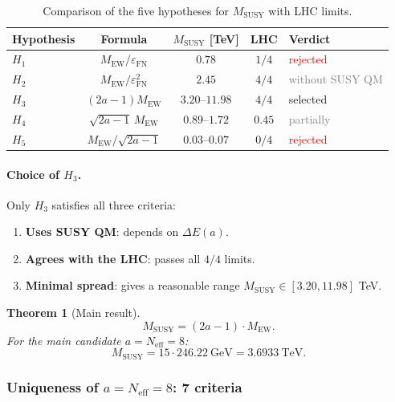 \documentclass[11pt,a4paper]{article}
\newcommand{\MEW}{M_{\text{EW}}}
\newcommand{\MSUSY}{M_{\text{SUSY}}}
\newcommand{\epsFN}{\varepsilon_{\text{FN}}}
\newtheorem{theorem}{Theorem}[section]
\theoremstyle{definition}
\begin{document}
\begin{table}[htbp]
\centering
\caption{Comparison of the five hypotheses for $\MSUSY$ with LHC limits.}
\label{tab:hypotheses-review}
\begin{tabular}{lcccl}
\toprule
Hypothesis & Formula & $\MSUSY$ [TeV] & LHC & Verdict \\
\midrule
$H_1$ & $\MEW/\epsFN$ & $0.78$ & $1/4$ & \textcolor{red}{rejected} \\
$H_2$ & $\MEW/\epsFN^2$ & $2.45$ & $4/4$ 
      & \textcolor{gray}{without SUSY QM} \\
$H_3$ & $(2a - 1) \MEW$ & $3.20$--$11.98$ & $4/4$ 
      & \textcolor{green!60!black}{selected} \\
$H_4$ & $\sqrt{2a-1}\,\MEW$ & $0.89$--$1.72$ & $0.45$ 
      & \textcolor{gray}{partially} \\
$H_5$ & $\MEW/\sqrt{2a-1}$ & $0.03$--$0.07$ & $0/4$ 
      & \textcolor{red}{rejected} \\
\bottomrule
\end{tabular}
\end{table}

\paragraph{Choice of $H_3$.}
Only $H_3$ satisfies all three criteria:
\begin{enumerate}
    \item \textbf{Uses SUSY QM}: depends on $\Delta E(a)$.
    \item \textbf{Agrees with the LHC}: passes all $4/4$ limits.
    \item \textbf{Minimal spread}: gives a reasonable range 
          $\MSUSY \in [3.20, 11.98]$ TeV.
\end{enumerate}

\begin{theorem}[Main result]
\label{thm:msusy-main-review}
\begin{equation}
    \boxed{
    \MSUSY = (2a - 1) \cdot \MEW.
    }
    \label{eq:msusy-h3-review}
\end{equation}
For the main candidate $a = N_{\text{eff}} = 8$:
\begin{equation}
    \boxed{
    \MSUSY = 15 \cdot 246.22~\text{GeV} = 3.6933~\text{TeV}.
    }
    \label{eq:msusy-final-review}
\end{equation}
\end{theorem}

\subsubsection{Uniqueness of \texorpdfstring{$a = N_{\text{eff}} = 8$}{a = N\_eff = 8}: 7 criteria}
\end{document}
